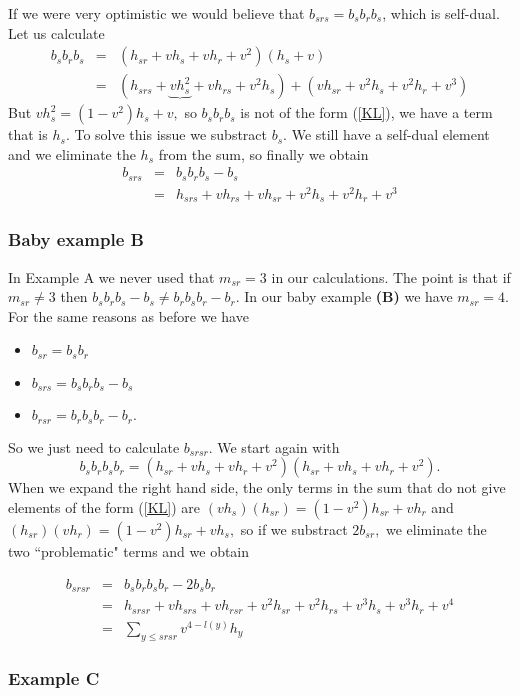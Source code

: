 \documentclass[12pt]{wart}
\theoremstyle{remark}
\begin{document}
If we were very optimistic we would believe that $b_{srs}=b_{s}b_{r}b_{s}$, which is self-dual. Let us calculate
\begin{eqnarray}
b_{s}b_{r}b_{s}&=&(h_{sr}+vh_s+vh_r+v^2)(h_s+v)\nonumber\\
&=&(h_{srs}+\underbrace{vh_s^2}+vh_{rs}+v^2h_s)+(vh_{sr}+v^2h_s+v^2h_r+v^3)
\end{eqnarray}
But $vh_s^2=(1-v^2)h_s +v,$ so $b_{s}b_{r}b_{s}$ is not of the form (\ref{KL}), we have a term that is $h_s$. To solve this issue we substract  $b_{s}.$ We still have a self-dual element and we eliminate the $h_s$ from the sum, so finally we obtain
\begin{eqnarray}
b_{srs}&=&b_{s}b_{r}b_{s}-b_{s}\nonumber\\
&=&h_{srs}+vh_{rs}+vh_{sr}+v^2h_s+v^2h_r+v^3
\end{eqnarray}

\subsubsection{Baby example B} In Example A we never used that $m_{sr}=3$ in our calculations. The point is that if $m_{sr}\neq 3$ then $b_{s}b_{r}b_{s}-b_{s}\neq b_{r}b_{s}b_{r}-b_{r}$. In our baby example \textbf{(B)} we have $m_{sr}=4. $ For the same reasons as before we have 
\begin{itemize}
\item $b_{sr}=b_{s}b_{r}$ 
\item $b_{srs}=b_{s}b_{r}b_{s}-b_{s}$ \item $b_{rsr}=b_{r}b_{s}b_{r}-b_{r}.$ 
\end{itemize}
So we just need to calculate $b_{srsr}.$
We start again with $$b_{s}b_{r}b_{s}b_{r}=(h_{sr}+vh_s+vh_r+v^2)(h_{sr}+vh_s+vh_r+v^2).$$
When we expand the right hand side, the only terms in the sum that do not give elements  of the form (\ref{KL}) are $(vh_s)(h_{sr})=(1-v^2)h_{sr}+vh_r$ and $(h_{sr})(vh_r)=(1-v^2)h_{sr}+vh_s,$ so if we substract $2b_{sr},$ we eliminate the two ``problematic" terms and we obtain 

\begin{eqnarray}
b_{srsr}&=&b_{s}b_{r}b_{s}b_{r}-2b_{s}b_{r}\nonumber\\
&=&h_{srsr}+vh_{srs}+vh_{rsr}+v^2h_{sr}+v^2h_{rs} +v^3h_s+v^3h_r+v^4\nonumber\\
&=& \sum_{y\leq srsr}v^{4-l(y)}h_y
\end{eqnarray}


\subsubsection{Example C}  
\end{document}
